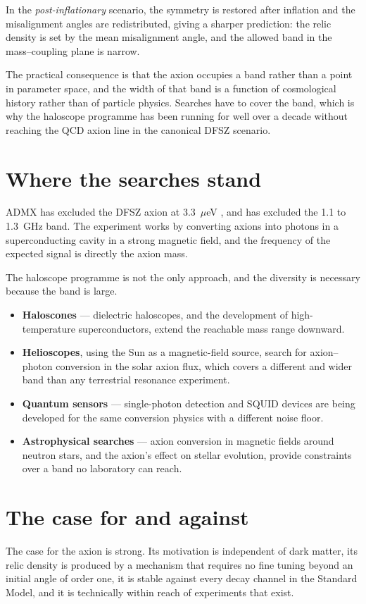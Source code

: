 In the \emph{post-inflationary} scenario, the symmetry is restored after
inflation and the misalignment angles are redistributed, giving a sharper
prediction: the relic density is set by the mean misalignment angle, and the
allowed band in the mass--coupling plane is narrow.

The practical consequence is that the axion occupies a band rather than a
point in parameter space, and the width of that band is a function of
cosmological history rather than of particle physics. Searches have to cover
the band, which is why the haloscope programme has been running for well over
a decade without reaching the QCD axion line in the canonical DFSZ scenario.

\section{Where the searches stand}ADMX has excluded the DFSZ axion at 3.3~$\mu$eV
, and has excluded the 1.1 to 1.3~GHz band. The
experiment works by converting axions into photons in a superconducting
cavity in a strong magnetic field, and the frequency of the expected signal
is directly the axion mass.

The haloscope programme is not the only approach, and the diversity is
necessary because the band is large.

\begin{itemize}
\item \textbf{Haloscones} --- dielectric haloscopes, and the development of
high-temperature superconductors, extend the reachable mass range downward.
\item \textbf{Helioscopes}, using the Sun as a magnetic-field source, search
for axion--photon conversion in the solar axion flux, which covers a
different and wider band than any terrestrial resonance experiment.
\item \textbf{Quantum sensors} --- single-photon detection and SQUID
devices are being developed for the same conversion physics with a
different noise floor.
\item \textbf{Astrophysical searches} --- axion conversion in magnetic fields
around neutron stars, and the axion's effect on stellar evolution, provide
constraints over a band no laboratory can reach.
\end{itemize}

\section{The case for and against}The case for the axion is strong. Its motivation is
independent of dark matter, its relic density is produced by a mechanism
that requires no fine tuning beyond an initial angle of order one, it is
stable against every decay channel in the Standard Model, and it is
technically within reach of experiments that exist.

